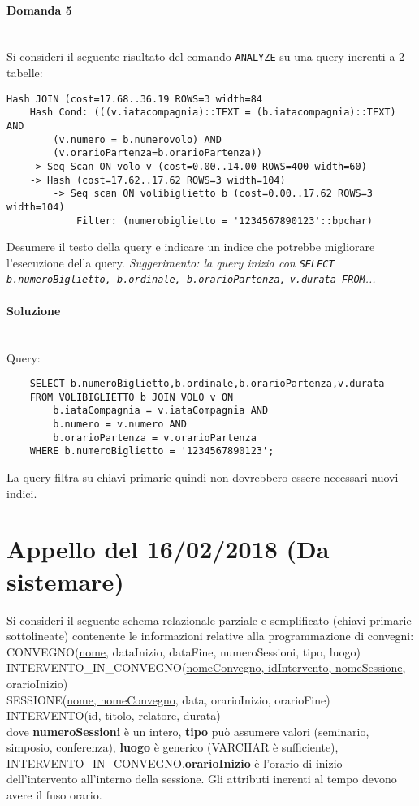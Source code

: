 \documentclass[a4paper, 10pt, titlepage]{article}
\begin{document}
\paragraph{Domanda 5}\dotfill
\\Si consideri il seguente risultato del comando \lstinline|ANALYZE| su una query inerenti a 2 tabelle:
\begin{small}
\begin{lstlisting}
Hash JOIN (cost=17.68..36.19 ROWS=3 width=84
	Hash Cond: (((v.iatacompagnia)::TEXT = (b.iatacompagnia)::TEXT) AND 
		(v.numero = b.numerovolo) AND
		(v.orarioPartenza=b.orarioPartenza))
	-> Seq Scan ON volo v (cost=0.00..14.00 ROWS=400 width=60)
	-> Hash (cost=17.62..17.62 ROWS=3 width=104)
		-> Seq scan ON volibiglietto b (cost=0.00..17.62 ROWS=3 width=104)
			Filter: (numerobiglietto = '1234567890123'::bpchar)
\end{lstlisting}
\end{small}
Desumere il testo della query e indicare un indice che potrebbe migliorare l'esecuzione della query. \textit{Suggerimento: la query inizia con {\small \lstinline|SELECT b.numeroBiglietto, b.ordinale, b.orarioPartenza,| \lstinline|v.durata FROM|...}}
\paragraph{Soluzione}\dotfill
\\Query:
\begin{lstlisting}
	SELECT b.numeroBiglietto,b.ordinale,b.orarioPartenza,v.durata
	FROM VOLIBIGLIETTO b JOIN VOLO v ON 
		b.iataCompagnia = v.iataCompagnia AND
		b.numero = v.numero AND
		b.orarioPartenza = v.orarioPartenza
	WHERE b.numeroBiglietto = '1234567890123';
\end{lstlisting}
La query filtra su chiavi primarie quindi non dovrebbero essere necessari nuovi indici. 

\newpage

\section{Appello del 16/02/2018 (Da sistemare)}
Si consideri il seguente schema relazionale parziale e semplificato (chiavi primarie sottolineate) contenente le informazioni relative alla programmazione di convegni: \medskip \\
CONVEGNO(\underline{nome}, dataInizio, dataFine, numeroSessioni, tipo, luogo)\\
INTERVENTO\_IN\_CONVEGNO(\underline{nomeConvegno, idIntervento, nomeSessione}, orarioInizio)\\
SESSIONE(\underline{nome, nomeConvegno}, data, orarioInizio, orarioFine)\\
INTERVENTO(\underline{id}, titolo, relatore, durata)\medskip \\
dove \textbf{numeroSessioni} è un intero, \textbf{tipo} può assumere valori (seminario, simposio, conferenza), \textbf{luogo} è generico (VARCHAR è sufficiente), INTERVENTO\_IN\_CONVEGNO.\textbf{orarioInizio} è l'orario di inizio dell'intervento all'interno della sessione. Gli attributi inerenti al tempo devono avere il fuso orario.
\end{document}
